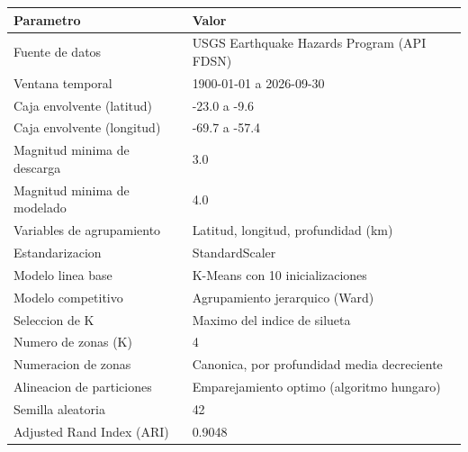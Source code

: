 \begin{tabular}{lp{6cm}}
\toprule
Parametro & Valor \\
\midrule
Fuente de datos & USGS Earthquake Hazards Program (API FDSN) \\
Ventana temporal & 1900-01-01 a 2026-09-30 \\
Caja envolvente (latitud) & -23.0 a -9.6 \\
Caja envolvente (longitud) & -69.7 a -57.4 \\
Magnitud minima de descarga & 3.0 \\
Magnitud minima de modelado & 4.0 \\
Variables de agrupamiento & Latitud, longitud, profundidad (km) \\
Estandarizacion & StandardScaler \\
Modelo linea base & K-Means con 10 inicializaciones \\
Modelo competitivo & Agrupamiento jerarquico (Ward) \\
Seleccion de K & Maximo del indice de silueta \\
Numero de zonas (K) & 4 \\
Numeracion de zonas & Canonica, por profundidad media decreciente \\
Alineacion de particiones & Emparejamiento optimo (algoritmo hungaro) \\
Semilla aleatoria & 42 \\
Adjusted Rand Index (ARI) & 0.9048 \\
\bottomrule
\end{tabular}
